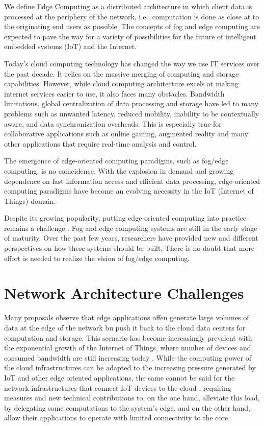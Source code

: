 We define Edge Computing as a distributed architecture in which client data
is processed at the periphery of the network,
i.e., computation is done as close at to the originating end users as possible.
The concepts of fog and edge computing are expected to pave the way for a 
variety of possibilities for the future of intelligent embedded systems (IoT)
and the Internet.

Today's cloud computing technology has changed the way we use IT services
over the past decade.
It relies on the massive merging of computing and storage capabilities.
However, while cloud computing architecture excels at making internet services 
easier to use,
it also faces many obstacles.
Bandwidth limitations,
global centralization of data processing and storage have led to many
problems such as unwanted latency,
reduced mobility,
inability to be contextually aware,
and data synchronization overheads.
This is especially true for collaborative applications such as online gaming,
augmented reality and many other applications that require real-time 
analysis and control.

The emergence of edge-oriented computing paradigms,
such as fog/edge computing,
is no coincidence.
With the explosion in demand and growing dependence on fast information access 
and efficient data processing, 
edge-oriented computing paradigms have become an evolving necessity in the 
IoT (Internet of Things) domain.

Despite its growing popularity, 
putting edge-oriented computing into practice remains a challenge
\cite{shi2016edge}.
Fog and edge computing systems are still in the early stage of maturity.
Over the past few years, 
researchers have provided new and different perspectives on how these systems 
should be built.
There is no doubt that more effort is needed to realize the vision of fog/edge
computing.

\section{Network Architecture Challenges}
\label{sec:network-architecture-challenges}
Many proposals observe that edge applications offen generate
\cite{openfog1934ieee, sitton2019review}
large volumes of data at the edge of the network bu push it back to the 
cloud data centers for computation and 
storage.
This scenario has become increasingly prevalent with the exponential growth 
of the Internet of Things, 
where number of devices and consumed bandwidth are still increasing today
\cite{cisco2019visualnetworking}.
While the computing power of the cloud infrastructures can be adapted to the 
increasing pressure generated by IoT and other edge oriented applications,
the same cannot be said for the network infrastructures that connect IoT 
devices to the cloud \cite{shi2016edge, tarneberg2016experiences}, 
requiring measures and new technical contributions to,
on the one hand,
alleviate this load,
by delegating some computations to the system's edge,
and on the other hand,
allow their applications to operate with limited connectivity to the core.

